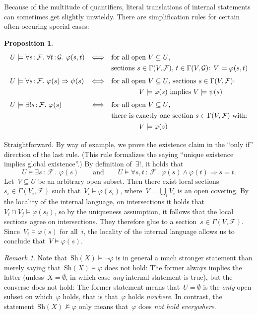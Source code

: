 \documentclass[10pt,reqno,a4paper]{amsbook}
\makeatletter
\theoremstyle{definition}
\theoremstyle{plain}
\newtheorem{prop}[defn]{Proposition}
\theoremstyle{remark}
\newtheorem{rem}[defn]{Remark}
\newcommand{\F}{\mathcal{F}}
\renewcommand{\G}{\mathcal{G}}
\newcommand{\Sh}{\mathrm{Sh}}
\newcommand{\?}{\,{:}\,}
\renewcommand{\_}{\mathpunct{.}\,}
\renewenvironment{proof}[1][\proofname]{\par
  \pushQED{\qed}%
  \normalfont \topsep6\p@\@plus6\p@\relax
  \trivlist
  \item[\hskip\labelsep
        \itshape
    #1\@addpunct{.}]\ignorespaces
}{%
  \popQED\endtrivlist\@endpefalse
}
\makeatother
\begin{document}
Because of the multitude of quantifiers, literal translations of internal statements
can sometimes get slightly unwieldy. There are simplification rules for certain
often-occuring special cases:
\begin{prop}\label{prop:simplification}
    \[ \renewcommand{\arraystretch}{1.3}\begin{array}{@{}lcl@{}}
      U \models \forall s\?\F\_ \forall t\?\G\_ \varphi(s,t)
      &\Longleftrightarrow&
      \text{for all open~$V \subseteq U$,} \\
      && \text{sections~$s \in \Gamma(V,\F)$, $t \in \Gamma(V,\G)$:
      $V \models \varphi(s,t)$} \\[0.3em]
      U \models \forall s\?\F\_ \varphi(s) \Rightarrow \psi(s)
      &\Longleftrightarrow&
      \text{for all open~$V \subseteq U$, sections~$s \in \Gamma(V,\F)$:} \\
      &&\qquad\qquad \text{$V \models \varphi(s)$ implies $V \models \psi(s)$}
      \\[0.3em]
      U \models \exists!s\?\F\_ \varphi(s)
      &\Longleftrightarrow&
      \text{for all open~$V \subseteq U$,} \\
      &&
      \text{there is exactly one section~$s \in \Gamma(V,\F)$ with:} \\
      &&\qquad\qquad V \models \varphi(s)
    \end{array} \]
\end{prop}
\begin{proof}Straightforward. By way of example, we prove the existence claim
in the ``only if'' direction of the last rule. (This rule formalizes
the saying ``unique existence implies global existence''.) By definition of~$\exists!$, it
holds that
\[ U \models \exists s\?\F\_ \varphi(s)
  \qquad\text{and}\qquad
  U \models \forall s,t\?\F\_ \varphi(s) \wedge \varphi(t) \Rightarrow s = t. \]
Let~$V \subseteq U$ be an arbitrary open subset. Then there exist local
sections~$s_i \in \Gamma(V_i,\F)$ such that~$V_i \models \varphi(s_i)$, where~$V
= \bigcup_i V_i$ is an open covering. By the locality of the internal language,
on intersections it holds that~$V_i \cap V_j \models \varphi(s_i)$, so by the
uniqueness assumption, it follows that the local sections agree on intersections.
They therefore glue to a section~$s \in \Gamma(V,\F)$. Since~$V_i \models
\varphi(s)$ for all~$i$, the locality of the internal language allows us to
conclude that~$V \models \varphi(s)$.
\end{proof}

\begin{rem}Note that~$\Sh(X) \models \neg\varphi$ is in general a much stronger
statement than merely saying that~$\Sh(X) \models \varphi$ does not hold:
The former always implies the latter (unless~$X = \emptyset$, in which case
\emph{any} internal statement is true), but the converse does not hold: The
former statement means that~$U = \emptyset$ is the \emph{only} open subset on
which~$\varphi$ holds, that is that~$\varphi$ holds \emph{nowhere}. In
contrast, the statement~$\Sh(X) \not\models \varphi$ only means that~$\varphi$
does \emph{not hold everywhere}.\end{rem}
\end{document}
